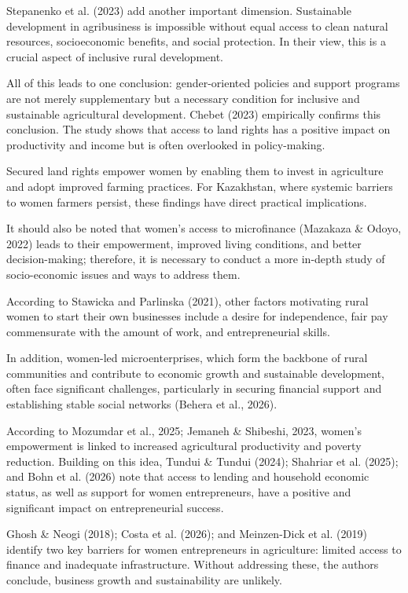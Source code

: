 ﻿\documentclass[sn-mathphys-num]{sn-jnl}
\newcommand{\hl}[1]{#1}
\begin{document}
\hl{Stepanenko et al. (2023)} add another important dimension.
Sustainable development in agribusiness is impossible without equal
access to clean natural resources, socioeconomic benefits, and social
protection. In their view, this is a crucial aspect of inclusive rural
development.

All of this leads to one conclusion: gender-oriented policies and
support programs are not merely supplementary but a necessary condition
for inclusive and sustainable agricultural development. \hl{Chebet
(2023)} empirically confirms this conclusion. The study shows that
access to land rights has a positive impact on productivity and income
but is often overlooked in policy-making.

Secured land rights empower women by enabling them to invest in
agriculture and adopt improved farming practices. For Kazakhstan, where
systemic barriers to women farmers persist, these findings have direct
practical implications.

It should also be noted that women's access to microfinance
(\hl{Mazakaza \& Odoyo, 2022)} leads to their empowerment, improved
living conditions, and better decision-making; therefore, it is
necessary to conduct a more in-depth study of socio-economic issues and
ways to address them.

According to \hl{Stawicka and Parlinska} (\hl{2021}), other factors
motivating rural women to start their own businesses include a desire
for independence, fair pay commensurate with the amount of work, and
entrepreneurial skills.

In addition, women-led microenterprises, which form the backbone of
rural communities and contribute to economic growth and sustainable
development, often face significant challenges, particularly in securing
financial support and establishing stable social networks (\hl{Behera et
al., 2026}).

According to \hl{Mozumdar et al., 2025}; \hl{Jemaneh \& Shibeshi, 2023},
women's empowerment is linked to increased agricultural productivity and
poverty reduction. Building on this idea, \hl{Tundui \& Tundui (2024});
\hl{Shahriar et al. (2025)}; and \hl{Bohn et al.} (\hl{2026}) note that
access to lending and household economic status, as well as support for
women entrepreneurs, have a positive and significant impact on
entrepreneurial success.

\hl{Ghosh \& Neogi (2018}); \hl{Costa et al. (2026); and Meinzen-Dick et
al. (2019)} identify two key barriers for women entrepreneurs in
agriculture: limited access to finance and inadequate infrastructure.
Without addressing these, the authors conclude, business growth and
sustainability are unlikely.
\end{document}
